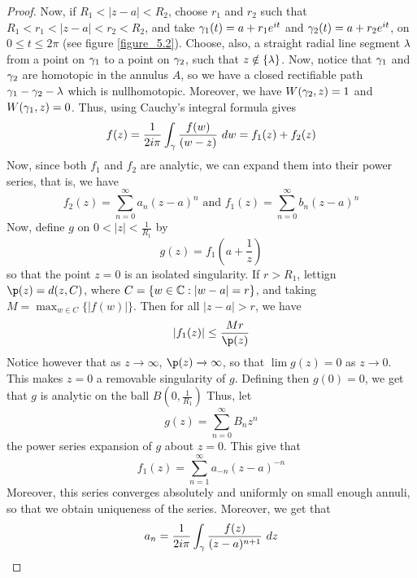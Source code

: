 \begin{proof}
    Now, if $R_1<|z-a|<R_2$, choose $r_1$ and $r_2$ such that
    $R_1<r_1<|z-a|<r_2<R_2$, and take $\gamma_1(t)=a+r_1e^{it}$ and
    $\gamma_2(t)=a+r_2e^{it}$, on $0 \leq t \leq 2\pi$ (see figure
    \ref{figure_5.2}). Choose, also, a straight radial line segment $\lambda$ from a
    point on $\gamma_1$ to a point on $\gamma_2$, such that $z \notin \{\lambda\}$. Now,
    notice that $\gamma_1$ and $\gamma_2$ are homotopic in the annulus $A$, so we have a
    closed rectifiable path  $\gamma_1-\gamma_2-\lambda$ which is nullhomotopic. Moreover, we
    have $W(\gamma_2,z)=1$ and $W(\gamma_1,z)=0$. Thus, using Cauchy's integral formula
    gives
    \begin{equation*}
        f(z)=\frac{1}{2i\pi}\int_{\gamma}{\frac{f(w)}{(w-z)} \ dw}=f_1(z)+f_2(z)
    \end{equation*}
    Now, since both $f_1$ and $f_2$ are analytic, we can expand them into their
    power series, that is, we have
    \begin{equation*}
        f_2(z)=\sum_{n=0}^\infty{a_n(z-a)^n} \text{ and }
        f_1(z)=\sum_{n=0}^\infty{b_n(z-a)^n}
    \end{equation*}
    Now, define $g$ on  $0<|z|<\frac{1}{R_1}$ by
    \begin{equation*}
        g(z)=f_1(a+\frac{1}{z})
    \end{equation*}
    so that the point $z=0$ is an isolated singularity. If  $r>R_1$, lettign
    $\p(z)=d(z,C)$, where $C=\{w \in \mathbb{C} : |w-a|=r\}$, and taking $M=\max_{w \in
    C}{\{|f(w)|\}}$. Then for all $|z-a|>r$, we have
    \begin{equation*}
        |f_1(z)| \leq \frac{Mr}{\p(z)}
    \end{equation*}
    Notice however that as $z \xrightarrow{} \infty$, $\p(z) \xrightarrow{}
    \infty$, so that $\lim{g(z)}=0$ as $z \xrightarrow{} 0$. This makes $z=0$ a
    removable singularity of $g$. Defining then  $g(0)=0$, we get that $g$ is
    analytic on the ball  $B(0,\frac{1}{R_1})$ Thus, let
    \begin{equation*}
        g(z)=\sum_{n=0}^\infty{B_nz^n}
    \end{equation*}
    the power series expansion of $g$ about  $z=0$. This give that
    \begin{equation*}
        f_1(z)=\sum_{n=1}^\infty{a_{-n}(z-a)^{-n}}
    \end{equation*}
    Moreover, this series converges absolutely and uniformly on small enough
    annuli, so that we obtain uniqueness of the series. Moreover, we get that
    \begin{equation*}
        a_n=\frac{1}{2i\pi}\int_\gamma{\frac{f(z)}{(z-a)^{n+1}} \ dz}
    \end{equation*}
\end{proof}
